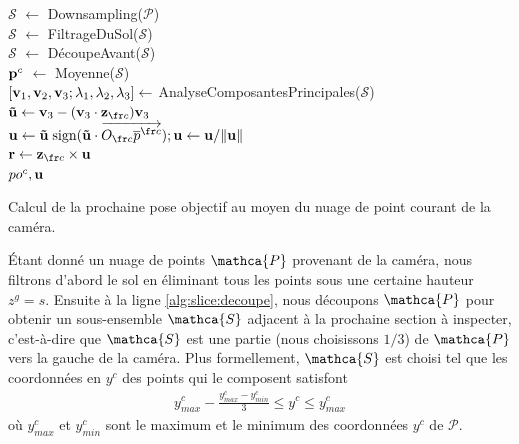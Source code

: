 \begin{algorithm}[ht]
  \SetAlgoLined

  $\mathcal S$  $\gets$ Downsampling($\mathcal P$)   \\
  $\mathcal S$  $\gets$ FiltrageDuSol($\mathcal S$)   \\
  $\mathcal S$  $\gets$ DécoupeAvant($\mathcal S$) \label{alg:slice:decoupe}   \\
  $\mathbf{p}^c$         $\gets$ Moyenne($\mathcal S$)         \\
  $[\mathbf{v}_1, \mathbf{v}_2, \mathbf{v}_3; \lambda_1, \lambda_2, \lambda_3] \gets$ AnalyseComposantesPrincipales($\mathcal S$) \label{alg:slice:pca}\\
  $\vect{\tilde u} \gets \vect{v}_3 - (\vect{v}_3\cdot\vect{z}_{\fr c})\vect{v}_3 $  \\
  $\vect{u} \gets \vect{\tilde u} \; \text{sign}(\vect{\tilde u} \cdot \overrightarrow{O_{\fr c} \overline{p}^{\fr c}}); \vect{u} \gets \vect{u}/\|\vect{u}\|$ \label{alg:slice:sign} \\
  $\vect{r} \gets \vect{z}_{\fr c} \times \vect{u}$ \\
  \Return ${po^c}, \mathbf{u}$

  \caption{Calcul de la prochaine pose objectif au moyen du nuage de point courant de la caméra.}
  \label{alg:PE_next_goal}
\end{algorithm}

Étant donné un nuage de points $\mathca{P}$ provenant de la caméra, nous filtrons d'abord le sol en éliminant tous les points sous une certaine hauteur $z^g = s$. Ensuite à la ligne \ref{alg:slice:decoupe}, nous découpons $\mathca{P}$ pour obtenir un sous-ensemble $\mathca{S}$ adjacent à la prochaine section à inspecter, c'est-à-dire que $\mathca{S}$ est une partie (nous choisissons $1/3$) de $\mathca{P}$ vers la gauche de la caméra. Plus formellement, $\mathca{S}$ est choisi tel que les coordonnées en $y^c$ des points qui le composent satisfont
\begin{align}
  y^c_{max} - \frac{y^c_{max} - y^c_{min}}{3} \leq y^c \leq y^c_{max}
\end{align}
où $y^c_{max}$ et $y^c_{min}$ sont le maximum et le minimum des coordonnées $y^c$ de $\mathcal{P}$.

